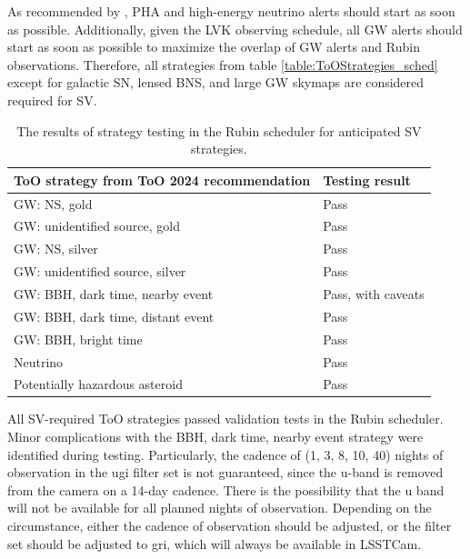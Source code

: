 As recommended by , PHA and high-energy neutrino alerts should start as soon as possible. Additionally, given the LVK observing schedule, all GW alerts should start as soon as possible to maximize the overlap of GW alerts and Rubin observations. Therefore, all strategies from table \ref{table:ToOStrategies_sched} except for galactic SN, lensed BNS, and large GW skymaps are considered required for SV.

\begin{table}[]
\centering
\begin{tabular}{|l|l|}
\hline
ToO strategy from ToO 2024 recommendation & Testing result       \\ \hline
GW: NS, gold                              & Pass                 \\ \hline
GW: unidentified source, gold             & Pass                 \\ \hline
GW: NS, silver                            & Pass                 \\ \hline
GW: unidentified source, silver           & Pass                 \\ \hline
GW: BBH, dark time, nearby event                             & Pass, with caveats \\ \hline
GW: BBH, dark time, distant event                              & Pass \\ \hline
GW: BBH, bright time                                & Pass \\ \hline
Neutrino                                  & Pass                 \\ \hline
Potentially hazardous asteroid                      & Pass                 \\ \hline
\end{tabular}
\caption{The results of strategy testing in the Rubin scheduler for anticipated SV strategies.}
\label{tab:SVRequiredStrategy results}
\end{table}

All SV-required ToO strategies passed validation tests in the Rubin scheduler. Minor complications with the BBH, dark time, nearby event strategy were identified during testing. Particularly, the cadence of (1, 3, 8, 10, 40) nights of observation in the ugi filter set is not guaranteed, since the u-band is removed from the camera on a 14-day cadence. There is the possibility that the u band will not be available for all planned nights of observation. Depending on the circumstance, either the cadence of observation should be adjusted, or the filter set should be adjusted to gri, which will always be available in LSSTCam.

